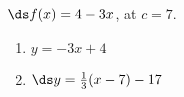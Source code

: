 {$\ds f(x) = 4-3x$, at $c=7$.
}
{\begin{enumerate}
\item		$y = -3x+4$
\item		$\ds y = \frac{1}{3}(x-7)-17$
\end{enumerate}
}
